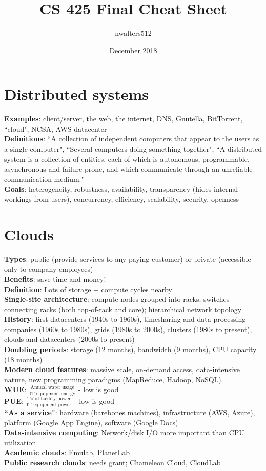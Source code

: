 \documentclass{article}
\title{CS 425 Final Cheat Sheet}
\author{nwalters512 }
\date{December 2018}
\begin{document}
\fontsize{6}{6}
\selectfont
\begin{multicols*}{3}
\section{Distributed systems}
\textbf{Examples}: client/server, the web, the internet, DNS, Gnutella, BitTorrent, ``cloud", NCSA, AWS datacenter \\
\textbf{Definitions}: ``A collection of independent computers that appear to the users as a single computer", ``Several computers doing something together", ``A distributed system is a collection of entities, each of which is autonomous, programmable, asynchronous and failure-prone, and which communicate through an unreliable communication medium." \\
\textbf{Goals}: heterogeneity, robustness, availability, transparency (hides internal workings from users), concurrency, efficiency, scalability, security, openness

\section{Clouds}
\textbf{Types}: public (provide services to any paying customer) or private (accessible only to company employees) \\
\textbf{Benefits}: save time and money! \\
\textbf{Definition}: Lots of storage + compute cycles nearby \\
\textbf{Single-site architecture}: compute nodes grouped into racks; switches connecting racks (both top-of-rack and core); hierarchical network topology \\
\textbf{History}: first datacenters (1940s to 1960s), timesharing and data processing companies (1960s to 1980s), grids (1980s to 2000s), clusters (1980s to present), clouds and datacenters (2000s to present) \\
\textbf{Doubling periods}: storage (12 months), bandwidth (9 months), CPU capacity (18 months) \\
\textbf{Modern cloud features}: massive scale, on-demand access, data-intensive nature, new programming paradigms (MapReduce, Hadoop, NoSQL) \\
\textbf{WUE}: $\frac{\text{Annual water usage}}{\text{IT equipment energy}}$ - low is good \\
\textbf{PUE}: $\frac{\text{Total facility power}}{\text{IT equipment power}}$ - low is good \\
\textbf{``As a service"}: hardware (barebones machines), infrastructure (AWS, Azure), platform (Google App Engine), software (Google Docs) \\
\textbf{Data-intensive computing}: Network/disk I/O more important than CPU utilization \\
\textbf{Academic clouds}: Emulab, PlanetLab \\
\textbf{Public research clouds}: needs grant; Chameleon Cloud, CloudLab


\end{multicols*}
\end{document}
